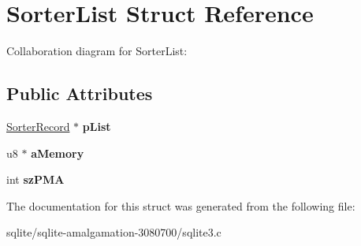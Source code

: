 \hypertarget{struct_sorter_list}{\section{Sorter\+List Struct Reference}
\label{struct_sorter_list}
}


Collaboration diagram for Sorter\+List\+:
\subsection*{Public Attributes}
\begin{DoxyCompactItemize}
\item 
\hypertarget{struct_sorter_list_a913640b1b917acccd7a851483f9d4e2b}{\hyperlink{struct_sorter_record}{Sorter\+Record} $\ast$ {\bfseries p\+List}}\label{struct_sorter_list_a913640b1b917acccd7a851483f9d4e2b}

\item 
\hypertarget{struct_sorter_list_ae0c7c3714fd8c61b806a5767ce686344}{u8 $\ast$ {\bfseries a\+Memory}}\label{struct_sorter_list_ae0c7c3714fd8c61b806a5767ce686344}

\item 
\hypertarget{struct_sorter_list_a4d14b7e48b155f6b79dd6fd37645b73c}{int {\bfseries sz\+P\+M\+A}}\label{struct_sorter_list_a4d14b7e48b155f6b79dd6fd37645b73c}

\end{DoxyCompactItemize}


The documentation for this struct was generated from the following file\+:\begin{DoxyCompactItemize}
\item 
sqlite/sqlite-\/amalgamation-\/3080700/sqlite3.\+c\end{DoxyCompactItemize}

